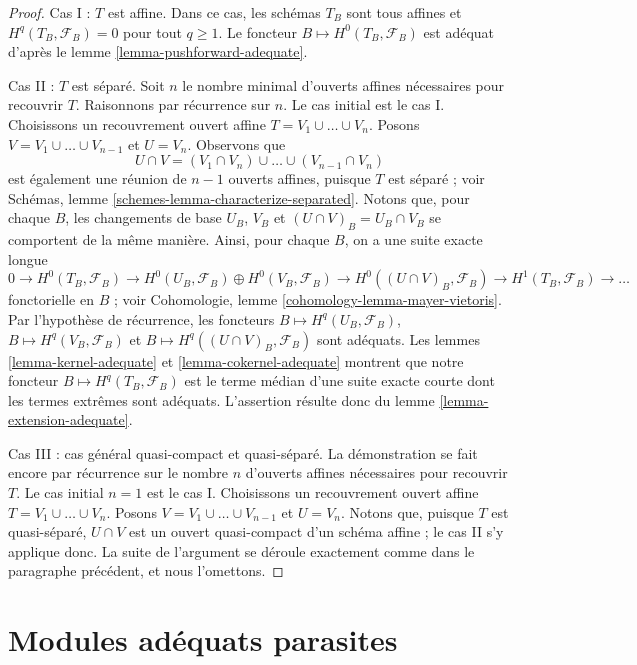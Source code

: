 \begin{proof}
\medskip\noindent
Cas I : $T$ est affine. Dans ce cas, les schémas $T_B$ sont tous affines
et $H^q(T_B, \mathcal{F}_B) = 0$ pour tout $q \geq 1$.
Le foncteur $B \mapsto H^0(T_B, \mathcal{F}_B)$ est adéquat d'après le
lemme \ref{lemma-pushforward-adequate}.

\medskip\noindent
Cas II : $T$ est séparé. Soit $n$ le nombre minimal d'ouverts affines nécessaires
pour recouvrir $T$. Raisonnons par récurrence sur $n$. Le cas initial est le cas I.
Choisissons un recouvrement ouvert affine $T = V_1 \cup \ldots \cup V_n$.
Posons $V = V_1 \cup \ldots \cup V_{n - 1}$ et $U = V_n$. Observons que
$$
U \cap V = (V_1 \cap V_n) \cup \ldots \cup (V_{n - 1} \cap V_n)
$$
est également une réunion de $n - 1$ ouverts affines, puisque $T$ est séparé ; voir
Schémas, lemme \ref{schemes-lemma-characterize-separated}.
Notons que, pour chaque $B$, les changements de base $U_B$, $V_B$ et
$(U \cap V)_B = U_B \cap V_B$ se comportent de la même manière. Ainsi,
pour chaque $B$, on a une suite exacte longue
$$
0 \to
H^0(T_B, \mathcal{F}_B) \to
H^0(U_B, \mathcal{F}_B) \oplus H^0(V_B, \mathcal{F}_B) \to
H^0((U \cap V)_B, \mathcal{F}_B) \to
H^1(T_B, \mathcal{F}_B) \to \ldots
$$
fonctorielle en $B$ ; voir
Cohomologie, lemme \ref{cohomology-lemma-mayer-vietoris}.
Par l'hypothèse de récurrence, les foncteurs
$B \mapsto H^q(U_B, \mathcal{F}_B)$,
$B \mapsto H^q(V_B, \mathcal{F}_B)$ et
$B \mapsto H^q((U \cap V)_B, \mathcal{F}_B)$
sont adéquats. Les
lemmes \ref{lemma-kernel-adequate} et
\ref{lemma-cokernel-adequate}
montrent que notre foncteur $B \mapsto H^q(T_B, \mathcal{F}_B)$ est le
terme médian d'une suite exacte courte dont les termes extrêmes sont adéquats.
L'assertion résulte donc du
lemme \ref{lemma-extension-adequate}.

\medskip\noindent
Cas III : cas général quasi-compact et quasi-séparé.
La démonstration se fait encore par récurrence sur le nombre $n$ d'ouverts affines
nécessaires pour recouvrir $T$. Le cas initial $n = 1$ est le cas I.
Choisissons un recouvrement ouvert affine $T = V_1 \cup \ldots \cup V_n$.
Posons $V = V_1 \cup \ldots \cup V_{n - 1}$ et $U = V_n$. Notons que,
puisque $T$ est quasi-séparé, $U \cap V$ est un ouvert quasi-compact d'un
schéma affine ; le cas II s'y applique donc. La suite de l'argument
se déroule exactement comme dans le paragraphe précédent, et nous
l'omettons.
\end{proof}







\section{Modules adéquats parasites}
\label{section-parasitic}

